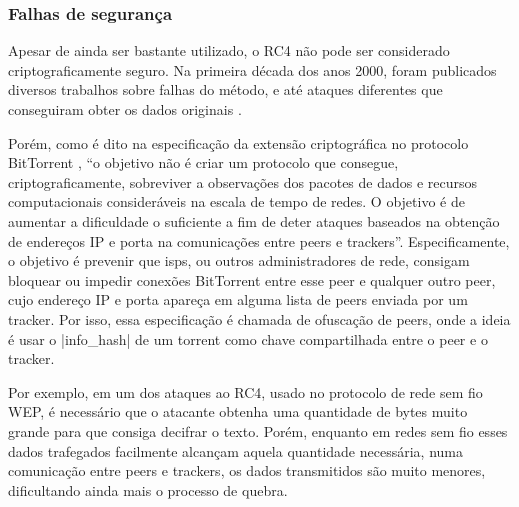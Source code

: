
\subsubsection*{Falhas de segurança}

Apesar de ainda ser bastante utilizado, o RC4 não pode ser considerado
criptograficamente seguro. Na primeira década dos anos 2000, foram publicados diversos
trabalhos sobre falhas do método, e até ataques diferentes que conseguiram obter os
dados originais
\cite{blog:matthew-rc4-1,blog:matthew-rc4-2,blog:matthew-rc4-3,artigo:patterson}.

Porém, como é dito na especificação da extensão criptográfica no protocolo BitTorrent
\cite{site:bittorrent-cripto}, ``o objetivo não é criar um protocolo que consegue,
criptograficamente, sobreviver a observações dos pacotes de dados e recursos
computacionais consideráveis na escala de tempo de redes. O objetivo é de aumentar a
dificuldade o suficiente a fim de deter ataques baseados na obtenção de endereços IP e
porta na comunicações entre \glspl*{peer} e \glspl*{tracker}''. Especificamente, o
objetivo é prevenir que \glspl{isp}, ou outros administradores de rede, consigam
bloquear ou impedir conexões BitTorrent entre esse \gls*{peer} e qualquer outro
\gls*{peer}, cujo endereço IP e porta apareça em alguma lista de \glspl*{peer} enviada
por um \gls*{tracker}. Por isso, essa especificação é chamada de ofuscação de
\glspl*{peer}, onde a ideia é usar o \bverb|info_hash| de um \gls*{torrent} como chave
compartilhada entre o \gls*{peer} e o \gls*{tracker}.

Por exemplo, em um dos ataques ao RC4, usado no protocolo de rede sem fio WEP, é
necessário que o atacante obtenha uma quantidade de bytes muito grande para que consiga
decifrar o texto. Porém, enquanto em redes sem fio esses dados trafegados facilmente
alcançam aquela quantidade necessária, numa comunicação entre \glspl*{peer} e
\glspl*{tracker}, os dados transmitidos são muito menores, dificultando ainda mais o
processo de quebra.